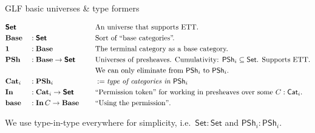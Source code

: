 \documentclass[dvipsnames,aspectratio=169]{beamer}
\newcommand{\mbf}[1]{\mathbf{#1}}
\newcommand{\bs}[1]{\boldsymbol{#1}}
\newcommand{\Set}{\mathsf{Set}}
\newcommand{\PSh}{\mathsf{PSh}}
\newcommand{\Cat}{\mathsf{Cat}}
\newcommand{\bBase}{\mathbf{Base}}
\newcommand{\bIn}{\mathbf{In}}
\newcommand{\bPSh}{\mathbf{PSh}}
\newcommand{\bCat}{\mathbf{Cat}}
\newcommand{\bbase}{\mathbf{base}}
\newcommand{\bSet}{\bs{\Set}}
\begin{document}
\begin{frame}{GLF basic universes \& type formers}

\begin{block}{}
\vspace{-1em}
\begin{alignat*}{3}
  & \bSet   &&           \hspace{8em}&& \text{An universe that supports ETT.}\\
  & \bBase  && : \bSet                 && \text{Sort of ``base categories''.} \\
  & \mbf{1} && : \bBase                && \text{The terminal category as a base category.} \\
  & \bPSh   && : \bBase \to \bSet      && \text{Universes of presheaves. Cumulativity: $\PSh_i \subseteq \Set$. Supports ETT.}\\
  &        &&                          && \text{We can only eliminate from $\PSh_i$ to $\PSh_i$.} \\
  & \bCat_i && : \bPSh_i               && := \text{\emph{type of categories in $\PSh_i$}} \\
  & \bIn    &&: \bCat_i \to \bSet      && \text{``Permission token'' for working in presheaves over some $C : \Cat_i$.} \\
  & \bbase  &&: \bIn\,C \to \bBase     && \text{``Using the permission''}.
\end{alignat*}
\end{block}
\vspace{1em}

{\small We use type-in-type everywhere for simplicity, i.e.\ $\Set : \Set$ and $\PSh_i : \PSh_i$.}

\end{frame}
\end{document}
